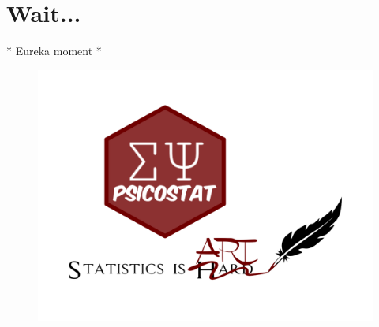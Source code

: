 \documentclass{beamer}
\begin{document}
\section{Wait...}

\begin{frame}
\begin{center}
	* Eureka moment *
\end{center}

\begin{figure}
	\centering
	\includegraphics[width=0.7\linewidth]{psicostat}
\end{figure}


\end{frame}
\end{document}
